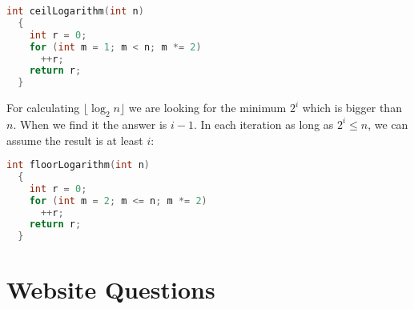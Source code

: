 \documentclass{book}
\begin{document}
	\begin{lstlisting}[language=C++, frame=single]
  int ceilLogarithm(int n)
  {
    int r = 0;    
    for (int m = 1; m < n; m *= 2)
      ++r;
    return r;
  }
	\end{lstlisting}
	For calculating $\lfloor \log_2{n} \rfloor$ we are looking for the minimum $2^i$ which is bigger than $n$. When we find it the answer is $i - 1$. In each iteration as long as $2^i \le n$, we can assume the result is at least $i$:
	
	\begin{lstlisting}[language=C++, frame=single]
  int floorLogarithm(int n)
  {
    int r = 0;    
    for (int m = 2; m <= n; m *= 2)
      ++r;
    return r;
  }
	\end{lstlisting}
	\section{Website Questions}
\end{document}
